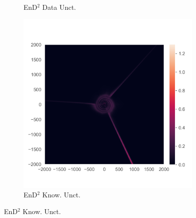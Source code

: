 \begin{figure}
\begin{subfigure}{0.22\textwidth}
  \caption{EnD$^2$ Data Unct.}
  \label{fig:3e}
\end{subfigure}%
\begin{subfigure}{0.22\textwidth}
  \centering
  \includegraphics[trim=42 45 15 55, clip, width=\linewidth]{plots/3f.png}
  \caption{EnD$^2$ Know. Unct.}
  \label{fig:3f}
\end{subfigure}%


\end{figure}
